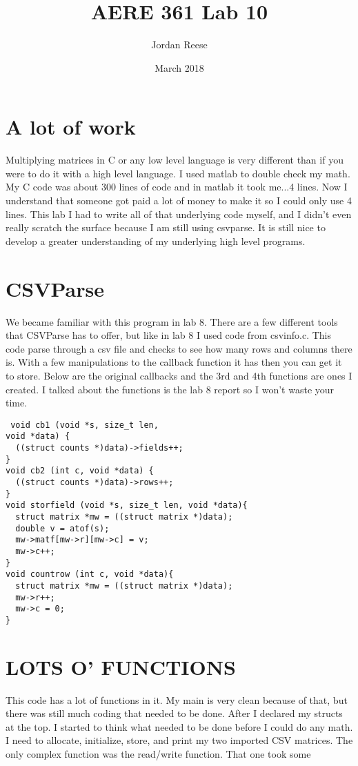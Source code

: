 \documentclass{article} \usepackage[utf8]{inputenc} \title{AERE 361 Lab 10} \author{Jordan Reese} \date{March 2018} \usepackage{listings} \usepackage{color} \definecolor{dkgreen}{rgb}{0,0.6,0} \definecolor{gray}{rgb}{0.5,0.5,0.5}
\begin{document}
 \maketitle \section*{A lot of work}
    Multiplying matrices in C or any low level language is very different than if you were to do it with a high level language. I used matlab to double check my math. My C code was about 300 lines of code and in matlab it took 
me...4 lines. Now I understand that someone got paid a lot of money to make it so I could only use 4 lines. This lab I had to write all of that underlying code myself, and I didn't even really scratch the surface because I am 
still using csvparse. It is still nice to develop a greater understanding of my underlying high level programs. \section*{CSVParse} \indent We became familiar with this program in lab 8. There are a few different tools that 
CSVParse has to offer, but like in lab 8 I used code from csvinfo.c. This code parse through a csv file and checks to see how many rows and columns there is. With a few manipulations to the callback function it has then you can 
get it to store. Below are the original callbacks and the 3rd and 4th functions are ones I created. I talked about the functions is the lab 8 report so I won't waste your time. \begin{lstlisting} void cb1 (void *s, size_t len, 
void *data) {
  ((struct counts *)data)->fields++;
}
void cb2 (int c, void *data) {
  ((struct counts *)data)->rows++;
}
void storfield (void *s, size_t len, void *data){
  struct matrix *mw = ((struct matrix *)data);
  double v = atof(s);
  mw->matf[mw->r][mw->c] = v;
  mw->c++;
}
void countrow (int c, void *data){
  struct matrix *mw = ((struct matrix *)data);
  mw->r++;
  mw->c = 0;
}
\end{lstlisting} \section*{LOTS O' FUNCTIONS} \indent This code has a lot of functions in it. My main is very clean because of that, but there was still much coding that needed to be done. After I declared my structs at the top. 
I started to think what needed to be done before I could do any math. I need to allocate, initialize, store, and print my two imported CSV matrices. The only complex function was the read/write function. That one took some 
\end{document}
